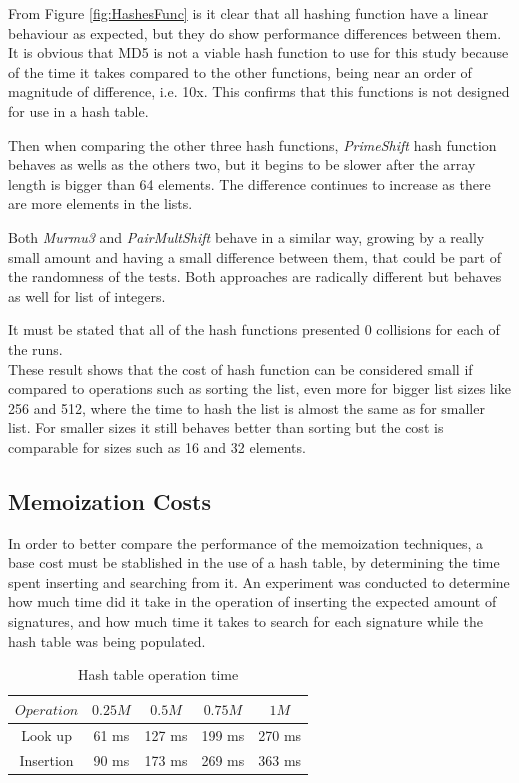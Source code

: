 \documentclass[a4paper,12pt]{article}
\begin{document}
From Figure \ref{fig:HashesFunc} is it clear that all hashing function have a linear behaviour as expected, but they do show performance differences between them. It is obvious that MD5 is not a viable hash function to use for this study because of the time it takes compared to the other functions, being near an order of magnitude of difference, i.e. 10x. This confirms that this functions is not designed for use in a hash table.

Then when comparing the other three hash functions, {\it PrimeShift} hash function behaves as wells as the others two, but it begins to be slower after the array length is bigger than 64 elements. The difference continues to increase as there are more elements in the lists.

Both {\it Murmu3} and {\it PairMultShift} behave in a similar way, growing by a really small amount and having a small difference between them, that could be part of the randomness of the tests. Both approaches are radically different but behaves as well for list of integers.

It must be stated that all of the hash functions presented 0 collisions for each of the runs.\\

These result shows that the cost of hash function can be considered small if compared to operations such as sorting the list, even more for bigger list sizes like 256 and 512, where the time to hash the list is almost the same as for smaller list. For smaller sizes it still behaves better than sorting but the cost is comparable for sizes such as 16 and 32 elements.

\subsection{Memoization Costs}

In order to better compare the performance of the memoization techniques, a base cost must be stablished in the use of a hash table, by determining the time spent inserting and searching from it. An experiment was conducted to determine how much time did it take in the operation of inserting the expected amount of signatures, and how much time it takes to search for each signature while the hash table was being populated. \\

\begin{table}[H]
\centering
\begin{tabular}{|c|c|c|c|c|}   \hline
	{$Operation$} & {$0.25M$} & {$0.5M$} & {$0.75M$} & {$1M$} \\  \hline
	Look up & 61 ms & 127 ms& 199 ms & 270 ms\\ 
	Insertion & 90 ms & 173 ms& 269 ms& 363 ms\\  \hline
\end{tabular}
\caption{Hash table operation time}
\label{ref:MemCostTable}
\end{table}
\end{document}
